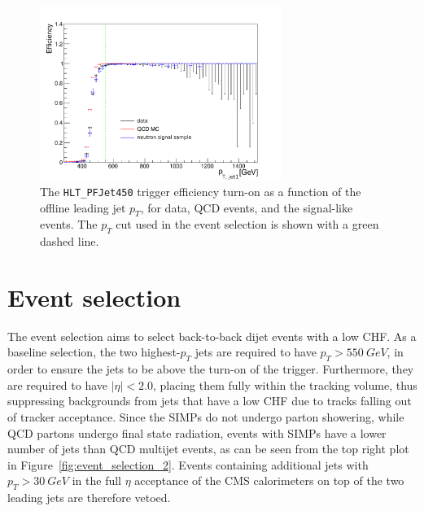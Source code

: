 \begin{figure}[ht]
  \centering
  \includegraphics[width=0.7\textwidth]{figures/trigger/pt_HLT_PFJet450_new.pdf}
  \caption{The \texttt{HLT\_PFJet450} trigger efficiency turn-on as a function of the offline leading jet $p_T$, for data, \acs{QCD} events, and the signal-like events. The $p_T$ cut used in the event selection is shown with a green dashed line.}
  \label{fig:ptturnon}
\end{figure}

\section{Event selection}
\label{sec:SIMP_selection}

The event selection aims to select back-to-back dijet events with a low CHF. As a baseline selection, the two highest-$p_T$ jets are required to have $p_T > \SI{550}{GeV}$, in order to ensure the jets to be above the turn-on of the trigger. Furthermore, they are required to have $|\eta| < 2.0$, placing them fully within the tracking volume, thus suppressing backgrounds from jets that have a low CHF due to tracks falling out of tracker acceptance. Since the \acp{SIMP} do not undergo parton showering, while \acs{QCD} partons undergo final state radiation, events with \acp{SIMP} have a lower number of jets than \acs{QCD} multijet events, as can be seen from the top right plot in Figure~\ref{fig:event_selection_2}. Events containing additional jets with $p_T>\SI{30}{GeV}$ in the full $\eta$ acceptance of the CMS calorimeters on top of the two leading jets are therefore vetoed.

